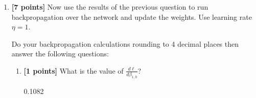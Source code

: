 \documentclass[11pt]{article}
\numberwithin{equation}{section} %
\numberwithin{figure}{section} %
\numberwithin{table}{section} %
\newcommand{\points}[1]{{\bf [#1 points]}}
\begin{document}
\begin{enumerate}
\begin{enumerate}
        \item \points{1} What is $\hat{y}_2$?
        
        \begin{tcolorbox}[fit,height=1cm, width=2cm, blank, borderline={1pt}{-2pt}]
            \begin{center}\huge0.2615\end{center}
        \end{tcolorbox}
        
        
        \item \points{1} Which class would we predict on this example? Your answer should just be an integer.
        
        \begin{tcolorbox}[fit,height=1cm, width=2cm, blank, borderline={1pt}{-2pt}]
            \begin{center}\huge3\end{center}
        \end{tcolorbox}
        
        
        \item \points{1} What is the total loss on this example?
        
        \begin{tcolorbox}[fit,height=1cm, width=2cm, blank, borderline={1pt}{-2pt}]
            \begin{center}\huge1.3413\end{center}
        \end{tcolorbox}
        
    \end{enumerate}
    
    \clearpage
\item \points{7} Now use the results of the previous question to run backpropagation over the network and update the weights. Use learning rate $\eta=1$. 
    
    Do your backpropagation calculations rounding to 4 decimal places then answer the following questions: 
    
     \begin{enumerate}
        \item \points{1} What is the value of $\frac{d\ell}{d\beta_{1,0}}$?
        
        \begin{tcolorbox}[fit,height=1cm, width=2cm, blank, borderline={1pt}{-2pt}]
            \begin{center}\huge0.1082\end{center}
        \end{tcolorbox}
        

\end{enumerate}
\end{enumerate}
\end{document}
